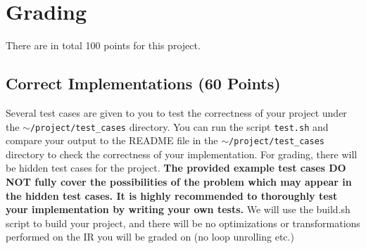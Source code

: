 \documentclass[12pt]{article}
\newcommand{\codeIn}[1]{{\small\tt{#1}}}
\begin{document}
\section{Grading}
There are in total 100 points for this project.

\subsection{Correct Implementations (60 Points)}

Several test cases are given to you to test the correctness of your project under the \codeIn{$\sim$/project/test\_cases} directory. You can run the script \codeIn{test.sh} and compare your output to the README file in the \codeIn{$\sim$/project/test\_cases} directory to check the correctness of your implementation. For grading, there will be hidden test cases for the project. \textbf{The provided example test cases DO NOT fully cover the possibilities of the problem which may appear in the hidden test cases. It is highly recommended to thoroughly test your implementation by writing your own tests.} We will use the build.sh script to build your project, and there will be no optimizations or transformations performed on the IR you will be graded on (no loop unrolling etc.)
\end{document}
